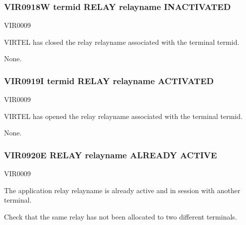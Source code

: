 \documentclass[letterpaper,10pt,english]{sphinxmanual}
\begin{document}
\subsubsection{VIR0918W termid RELAY relayname INACTIVATED}
\label{\detokenize{messages:vir0918w-termid-relay-relayname-inactivated}}\begin{description}
\sphinxAtStartPar
VIR0009

\sphinxAtStartPar
VIRTEL has closed the relay relayname associated with the terminal termid.

\sphinxAtStartPar
None.

\end{description}


\subsubsection{VIR0919I termid RELAY relayname ACTIVATED}
\label{\detokenize{messages:vir0919i-termid-relay-relayname-activated}}\begin{description}
\sphinxAtStartPar
VIR0009

\sphinxAtStartPar
VIRTEL has opened the relay relayname associated with the terminal termid.

\sphinxAtStartPar
None.

\end{description}


\subsubsection{VIR0920E RELAY relayname ALREADY ACTIVE}
\label{\detokenize{messages:vir0920e-relay-relayname-already-active}}\begin{description}
\sphinxAtStartPar
VIR0009

\sphinxAtStartPar
The application relay relayname is already active and in session with another terminal.

\sphinxAtStartPar
Check that the same relay has not been allocated to two different terminals.

\end{description}
\end{document}
